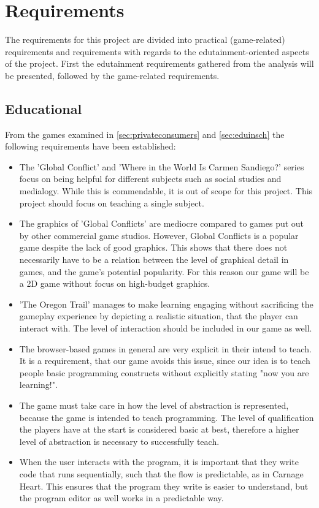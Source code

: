 \section{Requirements}
\label{sec:requirements}

The requirements for this project are divided into practical (game-related) requirements and requirements with regards to the edutainment-oriented aspects of the project.
First the edutainment requirements gathered from the analysis will be presented, followed by the game-related requirements.

\subsection{Educational}

From the games examined in \autoref{sec:privateconsumers} and \autoref{sec:eduinsch} the following requirements have been established: 

\begin{itemize}
	\item The 'Global Conflict' and 'Where in the World Is Carmen Sandiego?' series focus on being helpful for different subjects such as social studies and medialogy.
While this is commendable, it is out of scope for this project.
This project should focus on teaching a single subject.
	\item The graphics of 'Global Conflicts' are mediocre compared to games put out by other commercial game studios.
	However, Global Conflicts is a popular game despite the lack of good graphics.
	This shows that there does not necessarily have to be a relation between the level of graphical detail in games, and the game's potential popularity.
	For this reason our game will be a 2D game without focus on high-budget graphics.
	\item 'The Oregon Trail' manages to make learning engaging without sacrificing the gameplay experience by depicting a realistic situation, that the player can interact with.
	The level of interaction should be included in our game as well.
	\item The browser-based games in general are very explicit in their intend to teach.
	It is a requirement, that our game avoids this issue, since our idea is to teach people basic programming constructs without explicitly stating "now you are learning!".
	\item The game must take care in how the level of abstraction is represented, because the game is intended to teach programming.
	The level of qualification the players have at the start is considered basic at best, therefore a higher level of abstraction is necessary to successfully teach.
	\item When the user interacts with the program, it is important that they write code that runs sequentially, such that the flow is predictable, as in Carnage Heart.
	This ensures that the program they write is easier to understand, but the program editor as well works in a predictable way.
\end{itemize}

